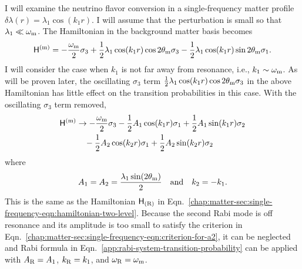 I will examine the neutrino flavor conversion in a single-frequency matter profile $\delta\lambda(r) = \lambda_1 \cos(k_1 r)$. I will assume that the perturbation is small so that $\lambda_1 \ll \omega_\mathrm m$. The Hamiltonian in the background matter basis becomes
\begin{equation}
\mathsf H^{(\mm)} = - \frac{\omega_\mm}{2}\sigma_3  + \frac{1}{2} \lambda_1 \cos(k_1 r) \cos 2\theta_\mm \sigma_3 - \frac{1}{2} \lambda_1 \cos(k_1 r)\sin 2\theta_\mm \sigma_1.
\label{chap:matter-sec:single-fequency-eq:hamiltonian-bg-matter-basis-single-frequency}
\end{equation}
I will consider the case when $k_1$ is not far away from resonance, i.e., $k_1 \sim \omega_\mathrm m$. As will be proven later, the oscillating $\sigma_3$ term $\frac{1}{2} \lambda_1 \cos(k_1 r) \cos 2\theta_\mathrm m \sigma_3$ in the above Hamiltonian has little effect on the transition probabilities in this case. With the oscillating $\sigma_3$ term removed, 
\begin{align}
    \mathsf H^{(\mm)} &\to -\frac{\omega_{\mathrm m}}{2} \sigma_3  - \frac{1}{2} A_1 \cos ( k_1 r)  \sigma_1 + \frac{1}{2} A_1\sin(k_1 r) \sigma_2 \nonumber\\
    &\phantom{\to} - \frac{1}{2} A_2 \cos ( k_2 r)  \sigma_1 + \frac{1}{2} A_2\sin(k_2 r) \sigma_2  
    \label{eq-hamiltonian-bg-matter-basis-single-frequency}
\end{align}
where
\begin{align}
    A_1 = A_2 = \frac{\lambda_1 \sin(2\theta_\mm) }{2} \quad \text{and} \quad k_2 = -k_1.
    \label{chap:matter-sec:single-eqn:rabi-amplitudes}
\end{align}
This is the same as the Hamiltonian $\mathsf H_{(\mathrm R)}$ in Eqn.~\ref{chap:matter-sec:single-frequency-eqn:hamiltonian-two-level}.
Because the second Rabi mode is off resonance and its amplitude is too small to satisfy the criterion in Eqn.~\ref{chap:matter-sec:single-frequency-eqn:criterion-for-a2}, it can be neglected and Rabi formula in Eqn.~\ref{app:rabi-system-transition-probability} can be applied with $A_\mathrm R=A_1$, $k_\mathrm R=k_1$, and $\omega_\mathrm R = \omega_\mathrm m$.
